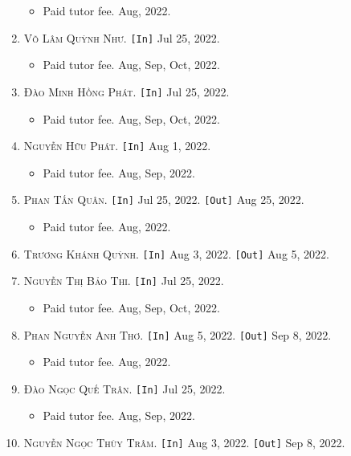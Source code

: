 \documentclass{article}
\numberwithin{equation}{section}
\begin{document}
\begin{enumerate}
	\begin{itemize}
		\item \textsf{Paid tutor fee.} Aug, 2022.
	\end{itemize}
	\item \textsc{Võ Lâm Quỳnh Như.} \texttt{[In]} Jul 25, 2022.
	\begin{itemize}
		\item \textsf{Paid tutor fee.} Aug, Sep, Oct, 2022.
	\end{itemize}
	\item \textsc{Đào Minh Hồng Phát.} \texttt{[In]} Jul 25, 2022.
	\begin{itemize}
		\item \textsf{Paid tutor fee.} Aug, Sep, Oct, 2022.
	\end{itemize}
	\item \textsc{Nguyễn Hữu Phát.} \texttt{[In]} Aug 1, 2022.
	\begin{itemize}
		\item \textsf{Paid tutor fee.} Aug, Sep, 2022.
	\end{itemize}
	\item \textsc{Phan Tấn Quân.} \texttt{[In]} Jul 25, 2022. \texttt{[Out]} Aug 25, 2022.
	\begin{itemize}
		\item \textsf{Paid tutor fee.} Aug, 2022.
	\end{itemize}
	\item \textsc{Trương Khánh Quỳnh.} \texttt{[In]} Aug 3, 2022. \texttt{[Out]} Aug 5, 2022.
	\item \textsc{Nguyễn Thị Bảo Thi.} \texttt{[In]} Jul 25, 2022.
	\begin{itemize}
		\item \textsf{Paid tutor fee.} Aug, Sep, Oct, 2022.
	\end{itemize}
	\item \textsc{Phan Nguyễn Anh Thơ.} \texttt{[In]} Aug 5, 2022. \texttt{[Out]} Sep 8, 2022.
	\begin{itemize}
		\item \textsf{Paid tutor fee.} Aug, 2022.
	\end{itemize}
	\item \textsc{Đào Ngọc Quế Trân.} \texttt{[In]} Jul 25, 2022.
	\begin{itemize}
		\item \textsf{Paid tutor fee.} Aug, Sep, 2022.
	\end{itemize}
	\item \textsc{Nguyễn Ngọc Thùy Trâm.} \texttt{[In]} Aug 3, 2022. \texttt{[Out]} Sep 8, 2022.

\end{enumerate}
\end{document}
